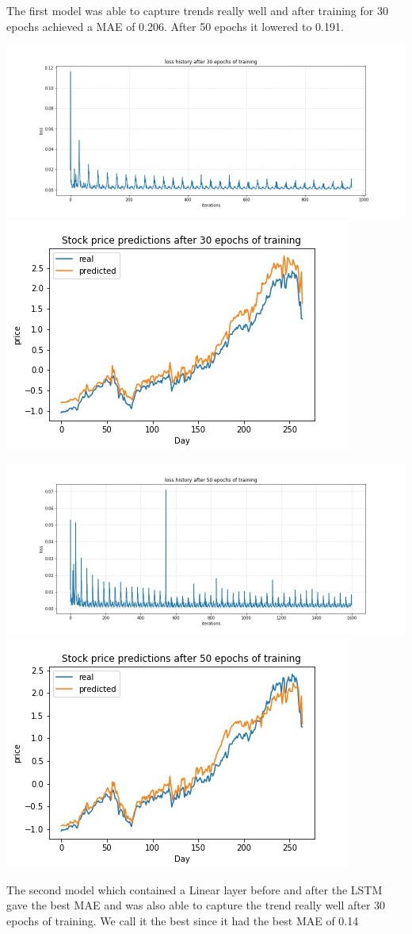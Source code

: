 \documentclass{article}
\begin{document}
The first model was able to capture trends really well and after training for 30 epochs achieved a MAE of 0.206. After 50 epochs it lowered to 0.191. \\


\begin{center}
	\includegraphics[width=.4\textwidth,height=.25\textwidth]{30-epoch-loss}
	\includegraphics[width=.4\textwidth]{30-epoch-preds}

	\includegraphics[width=.4\textwidth,height=.25\textwidth]{50-epoch-loss}
	\includegraphics[width=.4\textwidth]{50-epoch-preds}
\end{center}

The second model which contained a Linear layer before and after the LSTM gave the best MAE and was also able to capture the trend really well after 30 epochs of training. We call it the best since it had the best MAE of 0.14
\end{document}

